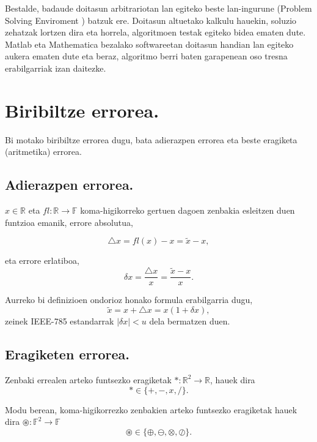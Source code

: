 Bestalde, badaude doitasun arbitrariotan lan egiteko beste lan-ingurune (Problem Solving Enviroment \cite{Higham2015}) batzuk ere. Doitasun altuetako kalkulu hauekin, soluzio zehatzak lortzen dira eta horrela, algoritmoen testak egiteko bidea ematen dute. Matlab eta Mathematica bezalako softwareetan doitasun handian lan egiteko aukera ematen dute eta beraz, algoritmo berri baten garapenean oso tresna erabilgarriak izan daitezke.

 
\section{Biribiltze errorea.}

Bi motako biribiltze errorea dugu, bata adierazpen errorea eta beste eragiketa (aritmetika) errorea.  

\subsection*{Adierazpen errorea.} 

$x \in \mathbb{R}$ eta $fl: \mathbb{R} \rightarrow \mathbb{F}$ 
koma-higikorreko gertuen dagoen zenbakia esleitzen duen funtzioa emanik, errore absolutua,

\begin{equation*}
\triangle x= fl(x)-x= \tilde{x}-x,  
\end{equation*}    
 
eta errore erlatiboa, 
\begin{equation*}
\delta x =\frac{\triangle x}{x} = \frac{\tilde{x}-x}{x}. 
\end{equation*}

Aurreko bi definizioen ondorioz honako formula erabilgarria dugu,
\begin{equation*}
\tilde{x}= x+\triangle x = x(1+\delta x),
\end{equation*}
zeinek IEEE-785 estandarrak $|\delta x|<u$ dela bermatzen duen.

\subsection*{Eragiketen errorea.} 
 
Zenbaki errealen arteko funtsezko eragiketak  $\ast: \mathbb{R}^2\rightarrow \mathbb{R}$, hauek dira
\begin{equation*}
\ast\in \{+,-,x,/ \}.
\end{equation*}

Modu berean, koma-higikorrezko zenbakien arteko funtsezko eragiketak hauek dira $\circledast: \mathbb{F}^2\rightarrow \mathbb{F}$
\begin{equation*}
\circledast\in \{\oplus,\ominus,\otimes,\oslash \}.
\end{equation*}

